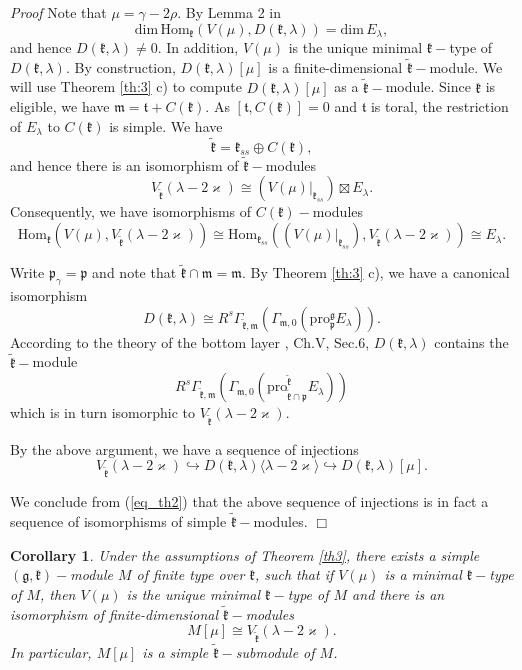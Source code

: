 \documentclass[default]{./styles/svmult}
\newtheorem{cor}[theo]{Corollary}
\renewenvironment{proof}{ \emph{Proof}}{$\Box$}
\newcommand{\pro}{\mathrm{pro}}
\newcommand{\Hom}{\mathrm{Hom}}
\renewcommand{\gg}{\mathfrak{g}}
\newcommand{\kk}{\mathfrak{k}}
\newcommand{\mm}{\mathfrak{m}}
\newcommand{\pp}{\mathfrak{p}}
\renewcommand{\tt}{\mathfrak{t}}
\begin{document}
\begin{proof}
 Note that $\mu = \gamma -2\rho.$ By Lemma 2 in \cite{PZ3} $$\mathrm{dim}\,\Hom_\kk(V(\mu),D(\kk,\lambda))=\mathrm{dim}\,E_{\lambda},$$ and hence $D(\kk,\lambda) \neq 0$. In addition, $V(\mu)$ is the unique minimal $\kk-$type of $D(\kk,\lambda)$. By construction, $D(\kk,\lambda)[\mu]$ is a finite-dimensional $\tilde{\kk}-$module. We will use Theorem \ref{th:3} c) to compute $D(\kk,\lambda)[\mu]$ as a $\tilde{\kk}-$module. Since $\kk$ is eligible, we have $\mm = \tt+C(\kk)$. As $[\tt,C(\kk)] = 0$ and $\tt$ is toral, the restriction of $E_{\lambda}$ to $C(\kk)$ is simple. We have
$$\tilde{\kk} = \kk_{ss} \oplus C(\kk),$$
and hence there is an isomorphism of $\tilde{\kk}-$modules
$$V_{\tilde{\kk}}(\lambda-2\varkappa) \cong (V(\mu)|_{\kk_{ss}})\boxtimes E_{\lambda}.$$
Consequently, we have isomorphisms of $C(\kk)-$modules
\begin{equation}\label{eq_th2}
 \Hom_{\kk} (V(\mu),V_{\tilde{\kk}}(\lambda - 2\varkappa)) \cong \Hom_{\kk_{ss}} ((V(\mu)|_{\kk_{ss}}),V_{\tilde{\kk}}(\lambda - 2\varkappa)) \cong E_{\lambda}.
\end{equation}
 
Write $\pp_\gamma = \pp$ and note that $\tilde{\kk} \cap \mm = \mm$. By Theorem \ref{th:3} c), we have a canonical isomorphism
$$D(\kk,\lambda) \cong R^s\Gamma_{\tilde{\kk},\mm}(\Gamma_{\mm,0}(\pro^{\gg}_{\pp}E_\lambda)).$$
According to the theory of the bottom layer \cite{KV}, Ch.V, Sec.6, $D(\kk,\lambda)$ contains the $\tilde{\kk}-$module
$$R^s\Gamma_{\tilde{\kk},\mm}(\Gamma_{\mm,0}(\mathrm{pro}_{\tilde{\kk}\cap\pp}^{\tilde{\kk}}E_\lambda))$$
which is in turn isomorphic to $V_{\tilde{\kk}}(\lambda-2\varkappa)$.

By the above argument, we have a sequence of injections
$$V_{\tilde{\kk}}(\lambda-2\varkappa) \hookrightarrow D(\kk,\lambda)\langle\lambda-2\varkappa\rangle \hookrightarrow D(\kk,\lambda)[\mu].$$

We conclude from (\ref{eq_th2}) that the above sequence of injections is in fact a sequence of isomorphisms of simple $\tilde{\kk}-$modules.
\end{proof}

\begin{cor}\label{corr3}
 Under the assumptions of Theorem \ref{th3}, there exists a simple $(\gg,\kk)-$module $M$ of finite type over $\kk$, such that if $V(\mu)$ is a minimal $\kk-$type of $M$, then $V(\mu)$ is the unique minimal $\kk-$type of $M$ and there is an isomorphism of finite-dimensional $\tilde{\kk}-$modules
$$M[\mu] \cong V_{\tilde{\kk}}(\lambda - 2\varkappa).$$ 
In particular, $M[\mu]$ is a simple $\tilde{\kk}-$submodule of $M$.
\end{cor}
\end{document}
